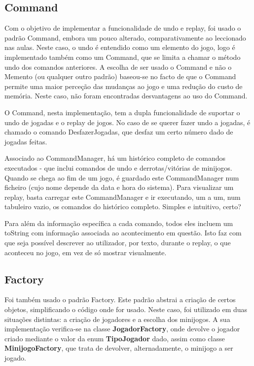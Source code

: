 \documentclass[11pt]{article}
\begin{document}
	\pagebreak
	
	\large
	\subsection{Command}
	\normalsize
	
	Com o objetivo de implementar a funcionalidade de undo e replay, foi usado o padrão Command, embora um pouco alterado, comparativamente ao leccionado nas aulas. Neste caso, o undo é entendido como um elemento do jogo, logo é implementado também como um Command, que se limita a chamar o método undo dos comandos anteriores. A escolha de ser usado o Command e não o Memento (ou qualquer outro padrão) baseou-se no facto de que o Command permite uma maior perceção das mudanças ao jogo e uma redução do custo de memória. Neste caso, não foram encontradas desvantagens ao uso do Command.
	
	O Command, nesta implementação, tem a dupla funcionalidade de suportar o undo de jogadas e o replay de jogos. No caso de se querer fazer undo a jogadas, é chamado o comando DesfazerJogadas, que desfaz um certo número dado de jogadas feitas.
	
	Associado ao CommandManager, há um histórico completo de comandos executados - que inclui comandos de undo e derrotas/vitórias de minijogos. Quando se chega ao fim de um jogo, é guardado este CommandManager num ficheiro (cujo nome depende da data e hora do sistema). Para visualizar um replay, basta carregar este CommandManager e ir executando, um a um, num tabuleiro vazio, os comandos do histórico completo. Simples e intuitivo, certo?
	
	Para além da informação específica a cada comando, todos eles incluem um toString com informação associada ao acontecimento em questão. Isto faz com que seja possível descrever ao utilizador, por texto, durante o replay, o que aconteceu no jogo, em vez de só mostrar visualmente.
	
	\large
	\subsection{Factory}
	\normalsize
	
	Foi também usado o padrão Factory. Este padrão abstrai a criação de certos objetos, simplificando o código onde for usado. Neste caso, foi utilizado em duas situações distintas: a criação de jogadores e a escolha dos minijogos. A sua implementação verifica-se na classe \textbf{JogadorFactory}, onde devolve o jogador criado mediante o valor da enum \textbf{TipoJogador} dado, assim como classe \textbf{MinijogoFactory}, que trata de devolver, alternadamente, o minijogo a ser jogado.
	
\end{document}
